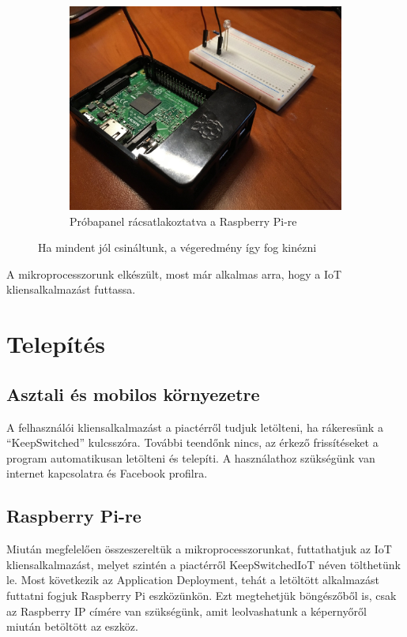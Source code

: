 \documentclass[a4paper,12pt]{report}
\begin{document}
\begin{figure}[h!]
\begin{subfigure}[b]{0.5\linewidth}
        \includegraphics[width=\linewidth]{images/osszeszerelt3.jpg}
        \caption{Próbapanel rácsatlakoztatva a Raspberry Pi-re}
    \end{subfigure}
    \caption{Ha mindent jól csináltunk, a végeredmény így fog kinézni}
    \label{fig:összeszerelés}
\end{figure}

    A mikroprocesszorunk elkészült, most már alkalmas arra, hogy a IoT kliensalkalmazást futtassa.

\section{Telepítés}

\subsection{Asztali és mobilos környezetre}
    A felhasználói kliensalkalmazást a piactérről tudjuk letölteni, ha rákeresünk a ``KeepSwitched'' kulcsszóra. További
    teendőnk nincs, az érkező frissítéseket a program automatikusan letölteni és telepíti.
    A használathoz szükségünk van internet kapcsolatra és Facebook profilra.

\subsection{Raspberry Pi-re}
    Miután megfelelően összeszereltük a mikroprocesszorunkat, futtathatjuk az IoT kliensalkalmazást, melyet szintén a piactérről
    KeepSwitchedIoT néven tölthetünk le.
    Most következik az Application Deployment, tehát a letöltött alkalmazást futtatni fogjuk Raspberry Pi eszközünkön. Ezt
    megtehetjük böngészőből is, csak az Raspberry IP címére van szükségünk, amit leolvashatunk a képernyőről miután betöltött
    az eszköz.
\end{document}
